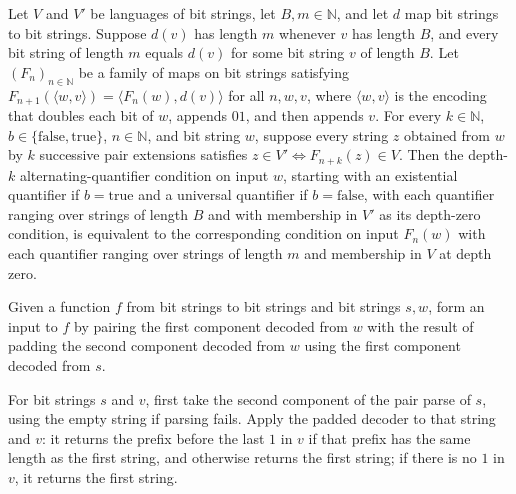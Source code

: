 \begin{theorem}
\label{Complexity.PolyHierarchy.altQuant_transfer}
\leanok
{}
Let $V$ and $V'$ be languages of bit strings, let $B,m\in\mathbb N$, and let $d$ map bit
strings to bit strings. Suppose $d(v)$ has length $m$ whenever $v$ has length $B$, and
every bit string of length $m$ equals $d(v)$ for some bit string $v$ of length $B$. Let
$(F_n)_{n\in\mathbb N}$ be a family of maps on bit strings satisfying $F_{n+1}(\langle
w,v\rangle)=\langle F_n(w),d(v)\rangle$ for all $n,w,v$, where $\langle w,v\rangle$ is
the encoding that doubles each bit of $w$, appends $01$, and then appends $v$. For every
$k\in\mathbb N$, $b\in\{\mathrm{false},\mathrm{true}\}$, $n\in\mathbb N$, and bit string
$w$, suppose every string $z$ obtained from $w$ by $k$ successive pair extensions
satisfies $z\in V'\iff F_{n+k}(z)\in V$. Then the depth-$k$ alternating-quantifier
condition on input $w$, starting with an existential quantifier if $b=\mathrm{true}$ and
a universal quantifier if $b=\mathrm{false}$, with each quantifier ranging over strings
of length $B$ and with membership in $V'$ as its depth-zero condition, is equivalent to
the corresponding condition on input $F_n(w)$ with each quantifier ranging over strings
of length $m$ and membership in $V$ at depth zero.
\end{theorem}

\begin{definition}
\label{Complexity.PolyHierarchy.nBase}
\leanok
{}
Given a function $f$ from bit strings to bit strings and bit strings $s,w$, form an
input to $f$ by pairing the first component decoded from $w$ with the result of padding
the second component decoded from $w$ using the first component decoded from $s$.
\end{definition}

\begin{definition}
\label{Complexity.PolyHierarchy.nDec}
\leanok
{}
For bit strings $s$ and $v$, first take the second component of the pair parse of $s$,
using the empty string if parsing fails. Apply the padded decoder to that string and
$v$: it returns the prefix before the last $1$ in $v$ if that prefix has the same length
as the first string, and otherwise returns the first string; if there is no $1$ in $v$,
it returns the first string.
\end{definition}

